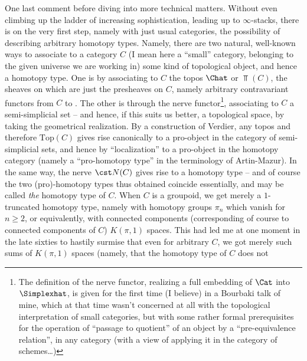 \DontChangeNextSectionNumber
\renewcommand{\thesection}{\arabic{section}bis}
\label{sec:16bis}%
One last comment before diving into more technical
matters. Without even climbing up the ladder of increasing
sophistication, leading up to $\infty$-stacks, there is on the very first
step, namely with just usual categories, the possibility of describing
arbitrary homotopy types. Namely, there are two natural, well-known ways to associate to a
category $C$ (I mean here a ``small'' category, belonging to the given
universe we are working in) some kind of topological object, and hence
a homotopy type. One is by associating to $C$ the topos $\Chat$
or $\Top(C)$, the sheaves on which are just the presheaves on $C$, namely arbitrary contravariant functors from $C$ to
\Sets. The other is through the nerve functor\footnote{The definition of the nerve functor, realizing a full embedding of $\Cat$ into $\Simplexhat$, is given for the first time (I believe) in a Bourbaki talk of mine, which at that time wasn't concerned at all with the topological interpretation of small categories, but with some rather formal prerequisites for the operation of ``passage to quotient'' of an object by a ``pre-equivalence relation'', in any category (with a view of applying it in the category of schemes\dots)}, associating to $C$
a semi-simplicial set -- and hence, if this suits us better, a
topological space, by taking the geometrical realization. By a
construction of Verdier, any topos and therefore $\mathrm{Top}(C)$
gives rise canonically to a pro-object in the category of semi-simplicial
sets, and hence by ``localization'' to a pro-object in the homotopy
category (namely a ``pro-homotopy type'' in the terminology of
Artin-Mazur). In the same way, the nerve $\cst N(C)$ gives rise to a
homotopy type -- and of course the two (pro)-homotopy types thus obtained coincide essentially, and may be called \emph{the}
homotopy type of $C$. When $C$ is a groupoid, we get merely a
$1$-truncated homotopy type, namely with homotopy groups $\pi_n$ which
vanish for $n\ge2$, or equivalently, with connected components
(corresponding of course to connected components of $C$) $K(\pi,1)$
spaces. This had led me at one moment in the late sixties to
hastily surmise that even for arbitrary $C$, we got merely such sums
of $K(\pi,1)$ spaces (namely, that the homotopy type of $C$ does not
